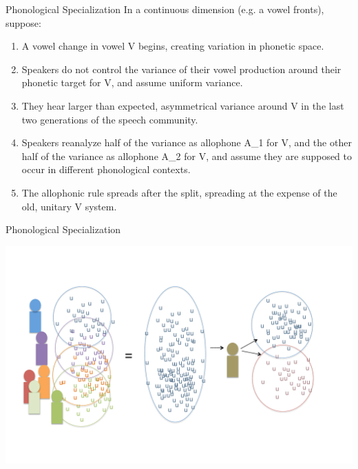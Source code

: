 \documentclass[hyperref={pdfpagelabels=false}]{beamer}
\begin{document}
\begin{frame}{Phonological Specialization}
	In a continuous dimension (e.g. a vowel fronts), suppose: \pause
	\begin{enumerate}
		\item A vowel change in vowel V begins, creating variation in phonetic space. \pause
		\item Speakers do not control the variance of their vowel production around their phonetic target for V, and assume uniform variance. \pause
		\item They hear larger than expected, asymmetrical variance around V in the last two generations of the speech community. \pause
		\item Speakers reanalyze half of the variance as allophone A_1 for V, and the other half of the variance as allophone A_2 for V, and assume they are supposed to occur in different phonological contexts. \pause
		\item The allophonic rule spreads after the split, spreading at the expense of the old, unitary V system. \pause

	\end{enumerate}

\end{frame}

\begin{frame}{Phonological Specialization}
	\begin{center}
	\includegraphics[trim=2cm 2cm 2cm 2cm, clip=false, width=.85\textwidth]{diavariance.pdf}
	\end{center}
\end{frame}
\end{document}
